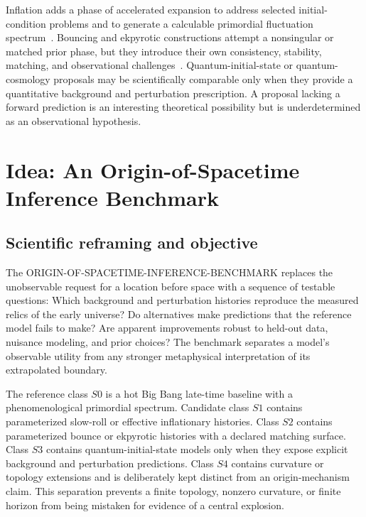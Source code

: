 \documentclass[10pt,conference]{IEEEtran}
\begin{document}
Inflation adds a phase of accelerated expansion to address selected initial-condition problems and to generate a calculable primordial fluctuation spectrum~\cite{guth1981}. Bouncing and ekpyrotic constructions attempt a nonsingular or matched prior phase, but they introduce their own consistency, stability, matching, and observational challenges~\cite{brandenberger2017}. Quantum-initial-state or quantum-cosmology proposals may be scientifically comparable only when they provide a quantitative background and perturbation prescription. A proposal lacking a forward prediction is an interesting theoretical possibility but is underdetermined as an observational hypothesis.

\section{Idea: An Origin-of-Spacetime Inference Benchmark}
\label{sec:idea}

\subsection{Scientific reframing and objective}

The ORIGIN-OF-SPACETIME-INFERENCE-BENCHMARK replaces the unobservable request for a location before space with a sequence of testable questions: Which background and perturbation histories reproduce the measured relics of the early universe? Do alternatives make predictions that the reference model fails to make? Are apparent improvements robust to held-out data, nuisance modeling, and prior choices? The benchmark separates a model's observable utility from any stronger metaphysical interpretation of its extrapolated boundary.

The reference class $S0$ is a hot Big Bang late-time baseline with a phenomenological primordial spectrum. Candidate class $S1$ contains parameterized slow-roll or effective inflationary histories. Class $S2$ contains parameterized bounce or ekpyrotic histories with a declared matching surface. Class $S3$ contains quantum-initial-state models only when they expose explicit background and perturbation predictions. Class $S4$ contains curvature or topology extensions and is deliberately kept distinct from an origin-mechanism claim. This separation prevents a finite topology, nonzero curvature, or finite horizon from being mistaken for evidence of a central explosion.
\end{document}
